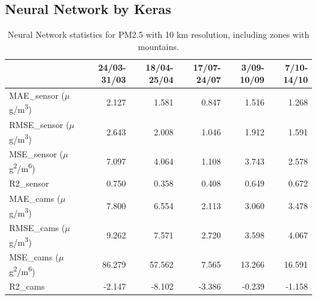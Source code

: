 \subsection{Neural Network by Keras}
\begin{table}[H]
\begin{tabular}{lrrrrr}
\toprule
 &  24/03-31/03 &  18/04-25/04 &  17/07-24/07 &  3/09-10/09 &  7/10-14/10 \\
\midrule
 MAE\_sensor ($\mu$g/m\textsuperscript{3})&        2.127 &        1.581 &        0.847 &       1.516 &       1.268 \\
RMSE\_sensor ($\mu$g/m\textsuperscript{3})&        2.643 &        2.008 &        1.046 &       1.912 &       1.591 \\
 MSE\_sensor ($\mu$g\textsuperscript{2}/m\textsuperscript{6})&        7.097 &        4.064 &        1.108 &       3.743 &       2.578 \\
  R2\_sensor &        0.750 &        0.358 &        0.408 &       0.649 &       0.672 \\
   MAE\_cams ($\mu$g/m\textsuperscript{3})&        7.800 &        6.554 &        2.113 &       3.060 &       3.478 \\
  RMSE\_cams ($\mu$g/m\textsuperscript{3})&        9.262 &        7.571 &        2.720 &       3.598 &       4.067 \\
   MSE\_cams ($\mu$g\textsuperscript{2}/m\textsuperscript{6})&       86.279 &       57.562 &        7.565 &      13.266 &      16.591 \\
    R2\_cams &       -2.147 &       -8.102 &       -3.386 &      -0.239 &      -1.158 \\
\bottomrule
\end{tabular}
\caption{Neural Network statistics for PM2.5 with 10 km resolution, including zones with mountains.}
\end{table}
